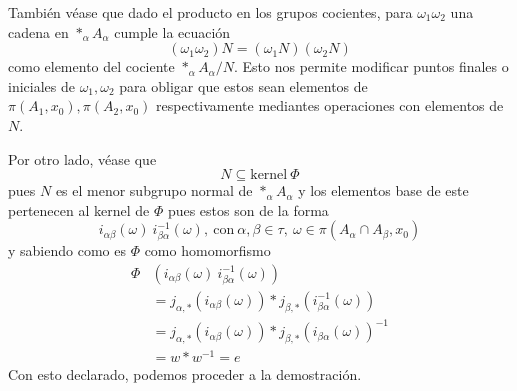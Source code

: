También véase que dado el producto en los
grupos cocientes, para \(\omega_1 \omega_2 \) una cadena en \(*_\alpha
A_\alpha\) cumple la ecuación
\[ (\omega_1 \omega_2) N = (\omega_1 N) (\omega_2 N) \]
como elemento del cociente \(*_\alpha A_\alpha / N\). Esto nos permite
modificar puntos finales o iniciales de \(\omega_1, \omega_2\) para
obligar que estos sean elementos de \(\pi (A_1, x_0), \pi (A_2, x_0)\)
respectivamente mediantes operaciones con elementos de \(N\).

Por otro lado, véase que
\[ N \subseteq \text{kernel} \ \Phi \]
pues \(N\) es el menor subgrupo normal de \(*_\alpha A_\alpha\) y los
elementos base de este pertenecen al kernel de \(\Phi\) pues estos son
de la forma
\[ i_{\alpha \beta} (\omega) \ i_{\beta \alpha}^{-1} (\omega) ,
  \ \text{con} \ \alpha,\beta \in \tau,\ \omega \in \pi(A_\alpha \cap
  A_\beta , x_0)\]
y sabiendo como es \(\Phi\) como homomorfismo
\begin{align*}
  \Phi &\left( i_{\alpha \beta} (\omega) \ i_{\beta \alpha}^{-1} (\omega) \right) \\
       &= j_{\alpha,*} \left(  i_{\alpha \beta} (\omega) \right) * j_{\beta,*} \left( i_{\beta \alpha}^{-1} (\omega) \right) \\
       &= j_{\alpha,*} \left(  i_{\alpha \beta} (\omega) \right) * j_{\beta,*} \left( i_{\beta \alpha} (\omega) \right)^{-1} \\
       &= w * w^{-1} = e
\end{align*}
Con esto
declarado, podemos proceder a la demostración.
